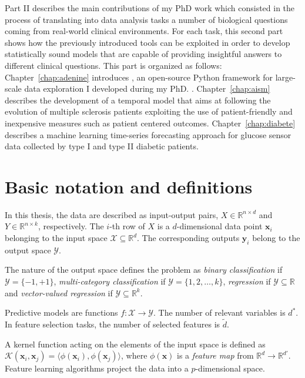 Part II describes the main contributions of my PhD work which consisted in the process of translating into data analysis tasks a number of biological questions coming from real-world clinical environments. For each task, this second part shows how the previously introduced tools can be exploited in order to develop statistically sound models that are capable of providing insightful answers to different clinical questions.
This part is organized as follows:
Chapter~\ref{chap:adenine} introduces \ade, an open-source Python framework for large-scale data exploration I developed during my PhD. .
Chapter~\ref{chap:aism} describes the development of a temporal model that aims at following the evolution of multiple sclerosis patients exploiting the use of patient-friendly and inexpensive measures such as patient centered outcomes.
Chapter~\ref{chap:diabete} describes a machine learning time-series forecasting approach for glucose sensor data collected by type I and type II diabetic patients.

\chapter{Basic notation and definitions} \label{sec:notation}
In this thesis, the data are described as input-output pairs, $X \in \mathbb{R}^{n \times d}$ and $Y \in \mathbb{R}^{n \times k}$, respectively.
The $i$-th row of $X$ is a $d$-dimensional data point $\bm{x}_{i}$ belonging to the input space $\mathcal{X}\subseteq\mathds{R}^d$. The corresponding outputs $\bm{y}_{i}$ belong to the output space $\mathcal{Y}$.

The nature of the output space defines the problem as {\sl binary classification} if  $\mathcal{Y} = \{-1,+1\}$, {\sl multi-category classification} if $\mathcal{Y} = \{1,2,\dots,k\}$, {\sl regression} if $\mathcal{Y}\subseteq\mathds{R}$ and {\sl vector-valued regression} if $\mathcal{Y}\subseteq\mathds{R}^k$.

Predictive models are functions $f: \mathcal{X} \rightarrow \mathcal{Y}$.
The number of relevant variables is $d^*$.
In feature selection tasks, the number of selected features is $\tilde d$.

A kernel function acting on the elements of the input space is defined as $\mathcal{K}(\bm{x}_{i},\bm{x}_{j})=\langle \phi(\bm{x}_{i}), \phi(\bm{x}_{j})\rangle$, where $\phi(\bm{x})$ is a {\em feature map} from $\mathds{R}^d \rightarrow \mathds{R}^{d'}$.
Feature learning algorithms project the data into a $p$-dimensional space.
